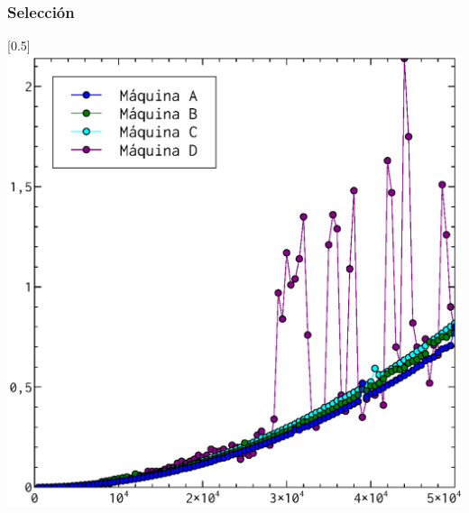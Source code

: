 \documentclass[compress]{beamer}
\begin{document}
\begin{frame}
\frametitle{Selección}
	\begin{center}
\scalebox{0.53}[0.5]{
    \includegraphics[]{seleccion_todos.eps}
}
\end{center}
\end{frame}
\end{document}
